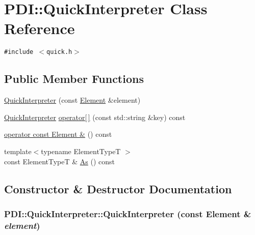 \hypertarget{class_p_d_i_1_1_quick_interpreter}{
\section{PDI::QuickInterpreter Class Reference}
\label{class_p_d_i_1_1_quick_interpreter}
}
{\tt \#include $<$quick.h$>$}

\subsection*{Public Member Functions}
\begin{CompactItemize}
\item 
\hyperlink{class_p_d_i_1_1_quick_interpreter_587070002f4f2fe69799ca4750f17aed}{QuickInterpreter} (const \hyperlink{class_p_d_i_1_1_element}{Element} \&element)
\item 
\hyperlink{class_p_d_i_1_1_quick_interpreter}{QuickInterpreter} \hyperlink{class_p_d_i_1_1_quick_interpreter_4589667715b8352c637e24f7fadfa3b2}{operator\mbox{[}$\,$\mbox{]}} (const std::string \&key) const 
\item 
\hyperlink{class_p_d_i_1_1_quick_interpreter_ba1cde54d9001c045096b16b034925a3}{operator const Element \&} () const 
\item 
{\footnotesize template$<$typename ElementTypeT $>$ }\\const ElementTypeT \& \hyperlink{class_p_d_i_1_1_quick_interpreter_1b14ba2bcaf09d56517ee187ba8c8af8}{As} () const 
\end{CompactItemize}


\subsection{Constructor \& Destructor Documentation}
\hypertarget{class_p_d_i_1_1_quick_interpreter_587070002f4f2fe69799ca4750f17aed}{
\subsubsection[{QuickInterpreter}]{\setlength{\rightskip}{0pt plus 5cm}PDI::QuickInterpreter::QuickInterpreter (const {\bf Element} \& {\em element})}}
\label{class_p_d_i_1_1_quick_interpreter_587070002f4f2fe69799ca4750f17aed}




